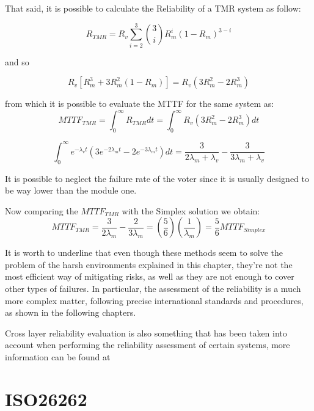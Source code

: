 \documentclass[./dissertation.tex]{subfiles}
\begin{document}
That said, it is possible to calculate the Reliability of a TMR system as follow:

\begin{equation}
    R_{TMR} = R_v \sum_{i=2}^{3} \binom{3}{i} R^i_m (1-R_m)^{3-i}
\end{equation}

and so 

\begin{equation}
    R_v [R_m^3 + 3R_m^2(1-R_m)] = R_v(3R^2_m - 2R_m^3)
\end{equation}

from which it is possible to evaluate the MTTF for the same system as:
\begin{equation}
MTTF_{TMR} = \int_0^{\infty}R_{TMR} dt = \int_0^{\infty}R_v (3R^2_m -2R^3_m)dt 
\end{equation}

\begin{equation}
\int_0^{\infty} e^{-\lambda_v t}\left( 3e^{-2\lambda_m t} -2e^{-3\lambda_m t}  \right) dt = \frac{3}{2\lambda_m + \lambda_v} - \frac{3}{3\lambda_m + \lambda_v}
\end{equation} 

It is possible to neglect the failure rate of the voter since it is usually designed to be way lower than the module one.

Now comparing the $MTTF_{TMR}$ with the Simplex solution we obtain:
\begin{equation}
    MTTF_{TMR} = \frac{3}{2\lambda_m} - \frac{2}{3\lambda_m} = \left( \frac{5}{6}\right) \left( \frac{1}{\lambda_m}\right) = \frac{5}{6} MTTF_{Simplex}
\end{equation}
\label{sec:iniziare}


It is worth to underline that even though these methods seem to solve the problem of the harsh environments explained in this chapter, they're not the most efficient way of mitigating risks, as well as they are not enough to cover other types of failures.
In particular, the assessment of the reliability is a much more complex matter, following precise international standards and procedures, as shown in the following chapters.

Cross layer reliability evaluation is also something that has been taken into account when performing the reliability assessment of certain systems, more information can be found at \cite{dinatale:hal-02986877}

\newpage\null\thispagestyle{empty}\newpage
\chapter{ISO26262}
\end{document}
